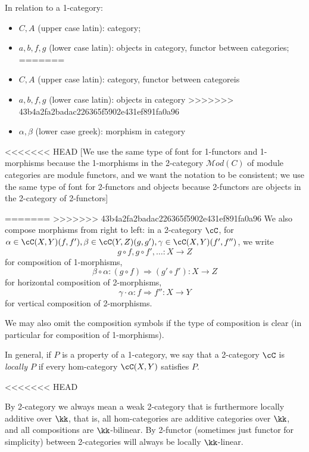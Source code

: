 \documentclass[12pt]{article}
\newcommand{\Mod}{{\mathcal{M}od}}
\newcommand{\Mod}{{\mathcal{M}od}}
\begin{document}
In relation to a 1-category:
\begin{itemize}
<<<<<<< HEAD
\item $C,A$ (upper case latin): category;

\item $a,b,f,g$ (lower case latin): objects in category,
	functor between categories;
=======
\item $C,A$ (upper case latin): category, functor between categoreis

\item $a,b,f,g$ (lower case latin): objects in category
>>>>>>> 43b4a2fa2badac226365f5902e431ef891fa0a96

\item $\alpha,\beta$ (lower case greek): morphism in category
\end{itemize}

<<<<<<< HEAD
[We use the same type of font for 1-functors and 1-morphisms
because the 1-morphisms in the 2-category $\Mod(C)$
of module categories are module functors,
and we want the notation to be consistent;
we use the same type of font for 2-functors and objects
because 2-functors are objects in the 2-category of
2-functors]

=======
>>>>>>> 43b4a2fa2badac226365f5902e431ef891fa0a96
We also compose morphisms from right to left:
in a 2-category $\cC$,
for $\alpha \in \cC(X,Y)(f,f'),
\beta \in \cC(Y,Z)(g,g'),
\gamma \in \cC(X,Y)(f',f'')$,
we write
\[
g \circ f, g \circ f', \ldots : X \to Z
\]
for composition of 1-morphisms,
\[
\beta \circ \alpha: (g \circ f) \Rightarrow (g' \circ f'):
	X \to Z
\]
for horizontal composition of 2-morphisms,
\[
\gamma \cdot \alpha: f \Rightarrow f'' : X \to Y
\]
for vertical composition of 2-morphisms.


We may also omit the composition symbols
if the type of composition is clear
(in particular for composition of 1-morphisms).



In general, if $P$ is a property of a 1-category,
we say that a 2-category $\cC$ is \emph{locally $P$}
if every hom-category $\cC(X,Y)$ satisfies $P$.

<<<<<<< HEAD

By 2-category we always mean a weak 2-category
that is furthermore locally additive over $\kk$,
that is, all hom-categories are
additive categories over $\kk$,
and all compositions are $\kk$-bilinear.
By 2-functor (sometimes just functor for simplicity)
between 2-categories will always be locally $\kk$-linear.
\end{document}
